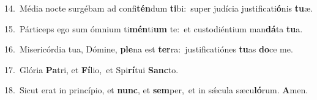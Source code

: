 {\numbfont\textcolor{\numbcolor}{14.}}~Média nocte surgébam ad confi\-\textbf{tén}\-dum \textbf{ti}\-bi:~\star super judícia justificati\-\textbf{ó}\-nis \textbf{tu}\-æ.\par
{\numbfont\textcolor{\numbcolor}{15.}}~Párticeps ego sum ómnium ti\-\textbf{mén}\-ti\textbf{um} te:~\star et custodiéntium man\-\textbf{dá}\-ta \textbf{tu}\-a.\par
{\numbfont\textcolor{\numbcolor}{16.}}~Misericórdia tua, Dómine, \textbf{ple}\-na est \textbf{ter}\-ra:~\star justificatiónes \textbf{tu}\-as \textbf{do}\-ce me.\par
{\numbfont\textcolor{\numbcolor}{17.}}~Glória \textbf{Pa}\-tri, et \textbf{Fí}\-lio,~\star et Spi\-\textbf{rí}\-tui \textbf{Sanc}\-to.\par
{\numbfont\textcolor{\numbcolor}{18.}}~Sicut erat in princípio, et \textbf{nunc}\-, et \textbf{sem}\-per,~\star et in sǽcula sæcu\-\textbf{ló}\-rum. \textbf{A}\-men.\par
